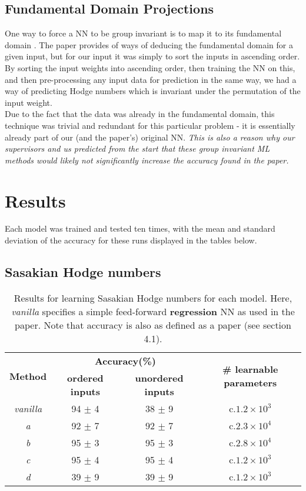 \documentclass{article}
\begin{document}
    


\subsection{Fundamental Domain Projections}
One way to force a NN to be group invariant is to map it to its fundamental domain \cite{aslan2022groupinvariantmachinelearning}. The paper provides of ways of deducing the fundamental domain for a given input, but for our input it was simply to sort the inputs in ascending order. \\

    By sorting the input weights into ascending order, then training the NN on this, and then pre-processing any input data for prediction in the same way, we had a way of predicting Hodge numbers which is invariant under the permutation of the input weight. \\
    

Due to the fact that the data was already in the fundamental domain, this technique was trivial and redundant for this particular problem - it is essentially already part of our (and the paper's) original NN. \emph{This is also a reason why our supervisors and us predicted from the start that these group invariant ML methods would likely not significantly increase the accuracy found in the paper.}

\section{Results}
Each model was trained and tested ten times, with the mean and standard deviation of the accuracy for these runs displayed in the tables below. 

\subsection{Sasakian Hodge numbers}
\begin{table}[ht]
\centering
\begin{tabular}{|c|c|c|c|}
\hline
\multirow{2}{*}{\textbf{Method}} & \multicolumn{2}{c|}{\textbf{Accuracy(\%)} } & \multirow{2}{*}{ \textbf{\# learnable parameters}} \\ \cline{2-3}
                         & \textbf{ordered inputs} & \textbf{unordered inputs} &                        \\ \hline
\emph{vanilla} & 94 $\pm$ 4 & 38 $\pm$ 9 & c.$1.2\times 10^3$ \\ \hline
\emph{a} & 92 $\pm$ 7 & 92 $\pm$ 7 & c.$2.3\times 10^4$ \\ \hline
\emph{b} & 95 $\pm$ 3 & 95 $\pm$ 3 & c.$2.8\times 10^4$ \\ \hline
\emph{c} & 95 $\pm$ 4 & 95 $\pm$ 4 & c.$1.2\times 10^3$ \\ \hline
\emph{d} & 39 $\pm$ 9 & 39 $\pm$ 9 & c.$1.2\times 10^3$ \\ \hline
\end{tabular}
\caption{Results for learning Sasakian Hodge numbers for each model. Here, \emph{vanilla} specifies a simple feed-forward \textbf{regression} NN as used in the paper. Note that accuracy is also as defined as a paper (see section 4.1).}
\end{table}
\end{document}
